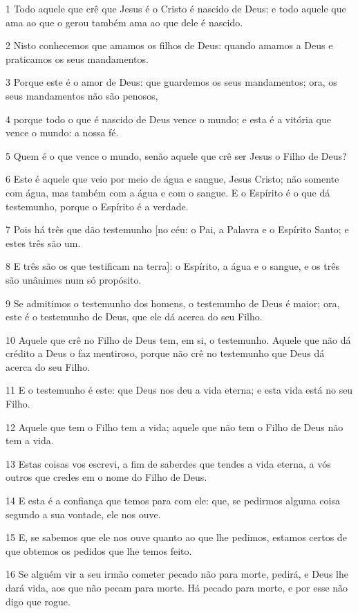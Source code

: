 \par 1 Todo aquele que crê que Jesus é o Cristo é nascido de Deus; e todo aquele que ama ao que o gerou também ama ao que dele é nascido.
\par 2 Nisto conhecemos que amamos os filhos de Deus: quando amamos a Deus e praticamos os seus mandamentos.
\par 3 Porque este é o amor de Deus: que guardemos os seus mandamentos; ora, os seus mandamentos não são penosos,
\par 4 porque todo o que é nascido de Deus vence o mundo; e esta é a vitória que vence o mundo: a nossa fé.
\par 5 Quem é o que vence o mundo, senão aquele que crê ser Jesus o Filho de Deus?
\par 6 Este é aquele que veio por meio de água e sangue, Jesus Cristo; não somente com água, mas também com a água e com o sangue. E o Espírito é o que dá testemunho, porque o Espírito é a verdade.
\par 7 Pois há três que dão testemunho [no céu: o Pai, a Palavra e o Espírito Santo; e estes três são um.
\par 8 E três são os que testificam na terra]: o Espírito, a água e o sangue, e os três são unânimes num só propósito.
\par 9 Se admitimos o testemunho dos homens, o testemunho de Deus é maior; ora, este é o testemunho de Deus, que ele dá acerca do seu Filho.
\par 10 Aquele que crê no Filho de Deus tem, em si, o testemunho. Aquele que não dá crédito a Deus o faz mentiroso, porque não crê no testemunho que Deus dá acerca do seu Filho.
\par 11 E o testemunho é este: que Deus nos deu a vida eterna; e esta vida está no seu Filho.
\par 12 Aquele que tem o Filho tem a vida; aquele que não tem o Filho de Deus não tem a vida.
\par 13 Estas coisas vos escrevi, a fim de saberdes que tendes a vida eterna, a vós outros que credes em o nome do Filho de Deus.
\par 14 E esta é a confiança que temos para com ele: que, se pedirmos alguma coisa segundo a sua vontade, ele nos ouve.
\par 15 E, se sabemos que ele nos ouve quanto ao que lhe pedimos, estamos certos de que obtemos os pedidos que lhe temos feito.
\par 16 Se alguém vir a seu irmão cometer pecado não para morte, pedirá, e Deus lhe dará vida, aos que não pecam para morte. Há pecado para morte, e por esse não digo que rogue.
